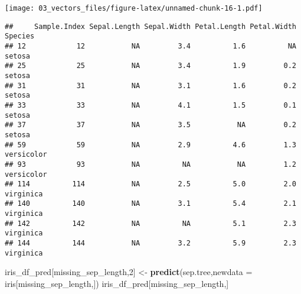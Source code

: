 \documentclass[
]{article}
\newenvironment{Shaded}{\begin{snugshade}}{\end{snugshade}}
\newcommand{\DataTypeTok}[1]{\textcolor[rgb]{0.13,0.29,0.53}{#1}}
\newcommand{\DecValTok}[1]{\textcolor[rgb]{0.00,0.00,0.81}{#1}}
\newcommand{\KeywordTok}[1]{\textcolor[rgb]{0.13,0.29,0.53}{\textbf{#1}}}
\newcommand{\NormalTok}[1]{#1}
\newcommand{\OperatorTok}[1]{\textcolor[rgb]{0.81,0.36,0.00}{\textbf{#1}}}
\newcommand{\StringTok}[1]{\textcolor[rgb]{0.31,0.60,0.02}{#1}}
\begin{document}
\texttt{[image: 03\_vectors\_files/figure-latex/unnamed-chunk-16-1.pdf]}

\begin{Shaded}
\end{Shaded}

\begin{verbatim}
##     Sample.Index Sepal.Length Sepal.Width Petal.Length Petal.Width    Species
## 12            12           NA         3.4          1.6          NA     setosa
## 25            25           NA         3.4          1.9         0.2     setosa
## 31            31           NA         3.1          1.6         0.2     setosa
## 33            33           NA         4.1          1.5         0.1     setosa
## 37            37           NA         3.5           NA         0.2     setosa
## 59            59           NA         2.9          4.6         1.3 versicolor
## 93            93           NA          NA           NA         1.2 versicolor
## 114          114           NA         2.5          5.0         2.0  virginica
## 140          140           NA         3.1          5.4         2.1  virginica
## 142          142           NA          NA          5.1         2.3  virginica
## 144          144           NA         3.2          5.9         2.3  virginica
\end{verbatim}

\begin{Shaded}
\begin{Highlighting}[]
\NormalTok{iris\_df\_pred[missing\_sep\_length,}\DecValTok{2}\NormalTok{] <{-}}\StringTok{ }\KeywordTok{predict}\NormalTok{(sep.tree,}\DataTypeTok{newdata =}\NormalTok{ iris[missing\_sep\_length,])}
\NormalTok{iris\_df\_pred[missing\_sep\_length,]}
\end{Highlighting}
\end{Shaded}
\end{document}
